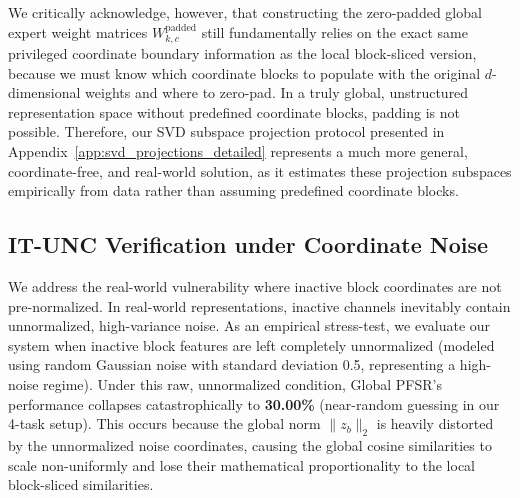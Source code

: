\documentclass{article}
\theoremstyle{plain}
\theoremstyle{definition}
\theoremstyle{remark}
\begin{document}
We critically acknowledge, however, that constructing the zero-padded global expert weight matrices $W_{k, c}^{\text{padded}}$ still fundamentally relies on the exact same privileged coordinate boundary information as the local block-sliced version, because we must know which coordinate blocks to populate with the original $d$-dimensional weights and where to zero-pad. In a truly global, unstructured representation space without predefined coordinate blocks, padding is not possible. Therefore, our SVD subspace projection protocol presented in Appendix~\ref{app:svd_projections_detailed} represents a much more general, coordinate-free, and real-world solution, as it estimates these projection subspaces empirically from data rather than assuming predefined coordinate blocks.

\subsection{IT-UNC Verification under Coordinate Noise}
We address the real-world vulnerability where inactive block coordinates are not pre-normalized. In real-world representations, inactive channels inevitably contain unnormalized, high-variance noise. As an empirical stress-test, we evaluate our system when inactive block features are left completely unnormalized (modeled using random Gaussian noise with standard deviation 0.5, representing a high-noise regime). Under this raw, unnormalized condition, Global PFSR's performance collapses catastrophically to \textbf{30.00\%} (near-random guessing in our 4-task setup). This occurs because the global norm $\|z_b\|_2$ is heavily distorted by the unnormalized noise coordinates, causing the global cosine similarities to scale non-uniformly and lose their mathematical proportionality to the local block-sliced similarities.
\end{document}
